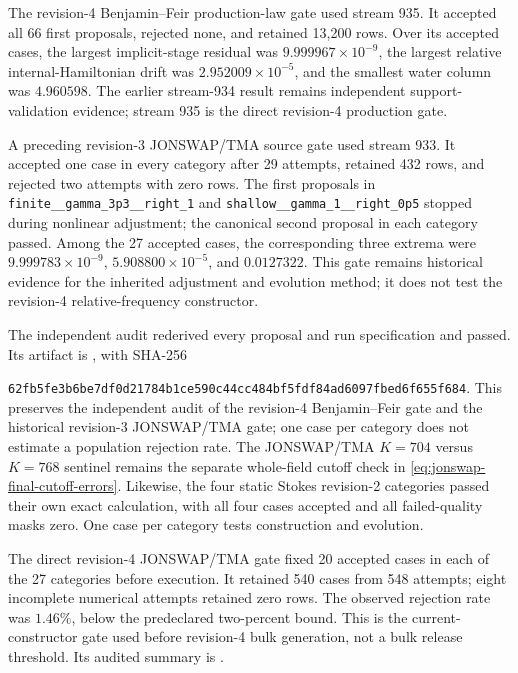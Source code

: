 \documentclass[10pt]{article}
\begin{document}
The revision-4 Benjamin--Feir production-law gate used stream 935.  It
accepted all 66 first proposals, rejected none, and retained 13,200 rows.
Over its accepted cases,
the largest implicit-stage residual was $9.999967\times10^{-9}$, the largest
relative internal-Hamiltonian drift was $2.952009\times10^{-5}$, and the
smallest water column was $4.960598$.  The earlier stream-934 result remains
independent support-validation evidence; stream 935 is the direct revision-4
production gate.

A preceding revision-3 JONSWAP/TMA source gate used stream 933.  It accepted
one case in every category after 29 attempts, retained 432 rows, and rejected
two attempts with zero rows.  The first proposals in
\texttt{finite\_\_gamma\_3p3\_\_right\_1} and
\texttt{shallow\_\_gamma\_1\_\_right\_0p5} stopped during nonlinear
adjustment; the canonical second proposal in each category passed.  Among the
27 accepted cases, the corresponding three extrema were
$9.999783\times10^{-9}$, $5.908800\times10^{-5}$, and $0.0127322$.
This gate remains historical evidence for the inherited adjustment and
evolution method; it does not test the revision-4 relative-frequency
constructor.

The independent audit rederived every proposal and run specification and
passed.  Its artifact is
,
with SHA-256
\par\noindent
\texttt{62fb5fe3b6be7df0d21784b1ce590c44cc484bf5fdf84ad6097fbed6f655f684}.
This preserves the independent audit of the revision-4 Benjamin--Feir gate
and the historical revision-3 JONSWAP/TMA gate; one case per category does
not estimate a population rejection rate.  The
JONSWAP/TMA \(K=704\) versus \(K=768\) sentinel remains the separate
whole-field cutoff check in \eqref{eq:jonswap-final-cutoff-errors}.  Likewise, the four
static Stokes revision-2 categories passed their own exact calculation, with
all four cases accepted and all failed-quality masks zero.  One case per
category tests construction and evolution.

The direct revision-4 JONSWAP/TMA gate fixed 20 accepted cases in each of the
27 categories before execution.  It retained 540 cases from 548 attempts;
eight incomplete numerical attempts retained zero rows.  The observed
rejection rate was \(1.46\%\), below the predeclared two-percent bound.  This
is the current-constructor gate used before revision-4 bulk generation, not a
bulk release threshold.  Its
audited summary is
.
\end{document}
